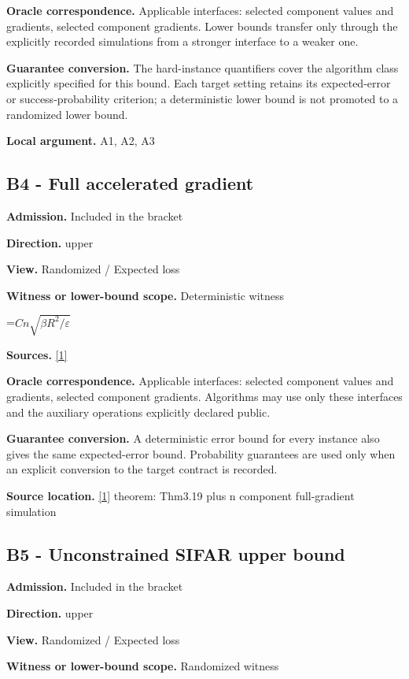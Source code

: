 \documentclass[10pt,a4paper]{article}
\newcommand{\AtlasMath}[1]{\par\begingroup\centering\setbox0=\hbox{$\displaystyle #1$}\ifdim\wd0>1.4\linewidth\typeout{ATLAS WIDE FORMULA: \the\wd0}\fi\ifdim\wd0>\linewidth\resizebox{\linewidth}{!}{\box0}\else\box0\fi\par\endgroup}
\begin{document}
\textbf{Oracle correspondence.} Applicable interfaces: selected component values and gradients, selected component gradients. Lower bounds transfer only through the explicitly recorded simulations from a stronger interface to a weaker one.

\textbf{Guarantee conversion.} The hard-instance quantifiers cover the algorithm class explicitly specified for this bound. Each target setting retains its expected-error or success-probability criterion; a deterministic lower bound is not promoted to a randomized lower bound.

\textbf{Local argument.} A1, A2, A3

\subsection{B4 - Full accelerated gradient}
\textbf{Admission.} Included in the bracket

\textbf{Direction.} upper

\textbf{View.} Randomized / Expected loss

\textbf{Witness or lower-bound scope.} Deterministic witness

\AtlasMath{Cn\sqrt{\beta R^2/\varepsilon}}
\textbf{Sources.} \href{https://arxiv.org/pdf/1405.4980}{[1]}

\textbf{Oracle correspondence.} Applicable interfaces: selected component values and gradients, selected component gradients. Algorithms may use only these interfaces and the auxiliary operations explicitly declared public.

\textbf{Guarantee conversion.} A deterministic error bound for every instance also gives the same expected-error bound. Probability guarantees are used only when an explicit conversion to the target contract is recorded.

\textbf{Source location.} \href{https://arxiv.org/pdf/1405.4980}{[1]} theorem: Thm3.19 plus n component full-gradient simulation

\subsection{B5 - Unconstrained SIFAR upper bound}
\textbf{Admission.} Included in the bracket

\textbf{Direction.} upper

\textbf{View.} Randomized / Expected loss

\textbf{Witness or lower-bound scope.} Randomized witness
\end{document}
